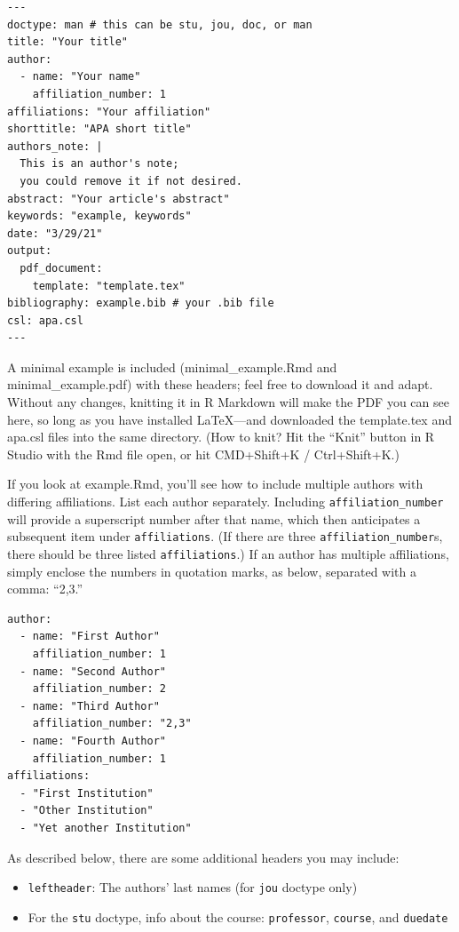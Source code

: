 \documentclass[jou]{apa7}
\providecommand{\tightlist}{%
  \setlength{\itemsep}{0pt}\setlength{\parskip}{0pt}}
\begin{document}
\begin{verbatim}
---
doctype: man # this can be stu, jou, doc, or man
title: "Your title"
author: 
  - name: "Your name"
    affiliation_number: 1
affiliations: "Your affiliation"
shorttitle: "APA short title"
authors_note: |
  This is an author's note; 
  you could remove it if not desired. 
abstract: "Your article's abstract"
keywords: "example, keywords"
date: "3/29/21"
output: 
  pdf_document:
    template: "template.tex"
bibliography: example.bib # your .bib file
csl: apa.csl
---
\end{verbatim}

A minimal example is included (minimal\_example.Rmd and
minimal\_example.pdf) with these headers; feel free to download it and
adapt. Without any changes, knitting it in R Markdown will make the PDF
you can see here, so long as you have installed LaTeX---and downloaded
the template.tex and apa.csl files into the same directory. (How to
knit? Hit the ``Knit'' button in R Studio with the Rmd file open, or hit
CMD+Shift+K / Ctrl+Shift+K.)

If you look at example.Rmd, you'll see how to include multiple authors
with differing affiliations. List each author separately. Including
\texttt{affiliation\_number} will provide a superscript number after
that name, which then anticipates a subsequent item under
\texttt{affiliations}. (If there are three
\texttt{affiliation\_number}s, there should be three listed
\texttt{affiliations}.) If an author has multiple affiliations, simply
enclose the numbers in quotation marks, as below, separated with a
comma: ``2,3.''

\begin{verbatim}
author: 
  - name: "First Author"
    affiliation_number: 1
  - name: "Second Author"
    affiliation_number: 2
  - name: "Third Author"
    affiliation_number: "2,3"
  - name: "Fourth Author"
    affiliation_number: 1
affiliations:
  - "First Institution"
  - "Other Institution"
  - "Yet another Institution"
\end{verbatim}

As described below, there are some additional headers you may include:

\begin{itemize}
\tightlist
\item
  \texttt{leftheader}: The authors' last names (for \texttt{jou} doctype
  only)
\item
  For the \texttt{stu} doctype, info about the course:
  \texttt{professor}, \texttt{course}, and \texttt{duedate}
\end{itemize}
\end{document}
